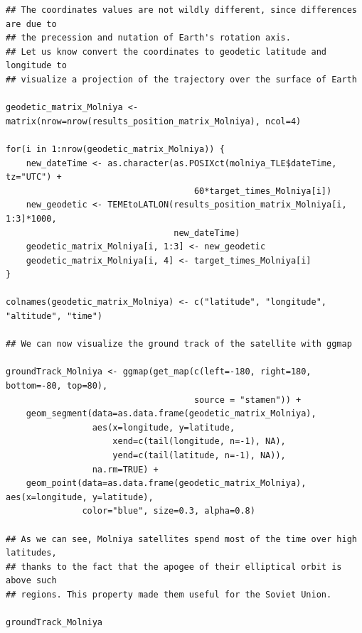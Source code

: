 \begin{verbatim}
## The coordinates values are not wildly different, since differences are due to
## the precession and nutation of Earth's rotation axis.
## Let us know convert the coordinates to geodetic latitude and longitude to
## visualize a projection of the trajectory over the surface of Earth

geodetic_matrix_Molniya <- matrix(nrow=nrow(results_position_matrix_Molniya), ncol=4)

for(i in 1:nrow(geodetic_matrix_Molniya)) {
    new_dateTime <- as.character(as.POSIXct(molniya_TLE$dateTime, tz="UTC") + 
                                     60*target_times_Molniya[i])
    new_geodetic <- TEMEtoLATLON(results_position_matrix_Molniya[i, 1:3]*1000,
                                 new_dateTime)
    geodetic_matrix_Molniya[i, 1:3] <- new_geodetic
    geodetic_matrix_Molniya[i, 4] <- target_times_Molniya[i]
}

colnames(geodetic_matrix_Molniya) <- c("latitude", "longitude", "altitude", "time")

## We can now visualize the ground track of the satellite with ggmap

groundTrack_Molniya <- ggmap(get_map(c(left=-180, right=180, bottom=-80, top=80),
                                     source = "stamen")) +
    geom_segment(data=as.data.frame(geodetic_matrix_Molniya), 
                 aes(x=longitude, y=latitude, 
                     xend=c(tail(longitude, n=-1), NA), 
                     yend=c(tail(latitude, n=-1), NA)), 
                 na.rm=TRUE) +
    geom_point(data=as.data.frame(geodetic_matrix_Molniya), aes(x=longitude, y=latitude), 
               color="blue", size=0.3, alpha=0.8)

## As we can see, Molniya satellites spend most of the time over high latitudes,
## thanks to the fact that the apogee of their elliptical orbit is above such
## regions. This property made them useful for the Soviet Union.

groundTrack_Molniya
\end{verbatim}

